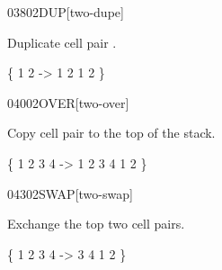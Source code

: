 \begin{worddef}{0380}{2DUP}[two-dupe]
\item {}

	Duplicate cell pair .

	\begin{defer}
	\testing
		\{ 1 2  -> 1 2 1 2 \}
	\end{defer}
\end{worddef}


\begin{worddef}{0400}{2OVER}[two-over]
\item {}

	Copy cell pair  to the top of the stack.

	\begin{defer}
	\testing
		\{ 1 2 3 4  -> 1 2 3 4 1 2 \}
	\end{defer}
\end{worddef}


\begin{worddef}{0430}{2SWAP}[two-swap]
\item {}

	Exchange the top two cell pairs.

	\begin{defer}
	\testing
		\{ 1 2 3 4  -> 3 4 1 2 \}
	\end{defer}
\end{worddef}


